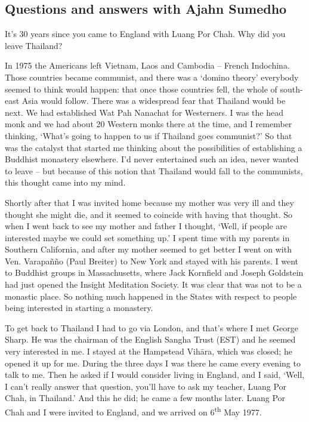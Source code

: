 
\subsection{Questions and answers with Ajahn Sumedho}

\question{}
It's 30 years since you came to England with Luang Por Chah. Why did
you leave Thailand?

\answer{}
In 1975 the Americans left Vietnam, Laos and Cambodia --
French Indochina. Those countries became communist, and there was a
`domino theory' everybody seemed to think would happen: that once those
countries fell, the whole of south-east Asia would follow. There was a
widespread fear that Thailand would be next. We had established Wat Pah
Nanachat for Westerners. I was the head monk and we had about 20
Western monks there at the time, and I remember thinking, `What's going
to happen to us if Thailand goes communist?' So that was the catalyst
that started me thinking about the possibilities of establishing a
Buddhist monastery elsewhere. I'd never entertained such an idea, never
wanted to leave -- but because of this notion that Thailand would fall
to the communists, this thought came into my mind. 

Shortly after that I was invited home because my mother was very ill and
they thought she might die, and it seemed to coincide with having that
thought. So when I went back to see my mother and father I thought, 
`Well, if people are interested maybe we could set something up.' I
spent time with my parents in Southern California, and after my mother
seemed to get better I went on with Ven. Varapañño (Paul Breiter) to New
York and stayed with his parents. I went to Buddhist groups in
Massachusetts, where Jack Kornfield and Joseph Goldstein had just opened
the Insight Meditation Society. It was clear that was not to be a
monastic place. So nothing much happened in the States with respect to
people being interested in starting a monastery. 

To get back to Thailand I had to go via London, and that's where I met
George Sharp. He was the chairman of the English Sangha Trust (EST) and
he seemed very interested in me. I stayed at the Hampstead Vihāra, which
was closed; he opened it up for me. During the three days I was there he
came every evening to talk to me. Then he asked if I would consider
living in England, and I said, `Well, I can't really answer that
question, you'll have to ask my teacher, Luang Por Chah, in Thailand.'
And this he did; he came a few months later. Luang Por Chah and I were
invited to England, and we arrived on 6\textsuperscript{th} May 1977.

